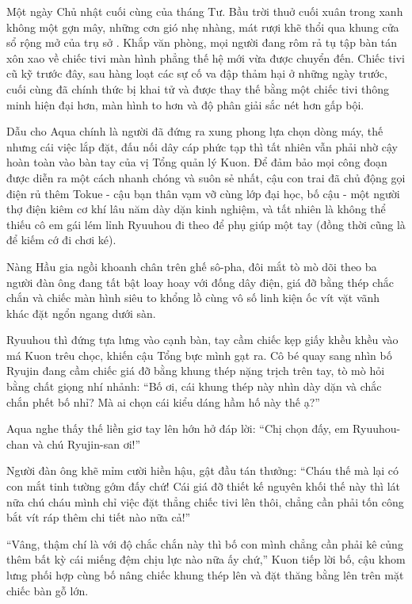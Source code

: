 \documentclass[../main.tex]{subfiles}
\begin{document}
Một ngày Chủ nhật cuối cùng của tháng Tư. Bầu trời thuở cuối xuân trong xanh không một gợn mây, những cơn gió nhẹ nhàng, mát rượi khẽ thổi qua khung cửa sổ rộng mở của trụ sở \hll. Khắp văn phòng, mọi người đang rôm rả tụ tập bàn tán xôn xao về chiếc tivi màn hình phẳng thế hệ mới vừa được chuyển đến. Chiếc tivi cũ kỹ trước đây, sau hàng loạt các sự cố va đập thảm hại ở những ngày trước, cuối cùng đã chính thức bị khai tử và được thay thế bằng một chiếc tivi thông minh hiện đại hơn, màn hình to hơn và độ phân giải sắc nét hơn gấp bội.

Dẫu cho Aqua chính là người đã đứng ra xung phong lựa chọn dòng máy, thế nhưng cái việc lắp đặt, đấu nối dây cáp phức tạp thì tất nhiên vẫn phải nhờ cậy hoàn toàn vào bàn tay của vị Tổng quản lý Kuon. Để đảm bảo mọi công đoạn được diễn ra một cách nhanh chóng và suôn sẻ nhất, cậu con trai đã chủ động gọi điện rủ thêm Tokue - cậu bạn thân vạm vỡ cùng lớp đại học, bố cậu - một người thợ điện kiêm cơ khí lâu năm dày dặn kinh nghiệm, và tất nhiên là không thể thiếu cô em gái lém lỉnh Ryuuhou đi theo để phụ giúp một tay (đồng thời cũng là để kiếm cớ đi chơi ké).

Nàng Hầu gia ngồi khoanh chân trên ghế sô-pha, đôi mắt tò mò dõi theo ba người đàn ông đang tất bật loay hoay với đống dây điện, giá đỡ bằng thép chắc chắn và chiếc màn hình siêu to khổng lồ cùng vô số linh kiện ốc vít vặt vãnh khác đặt ngổn ngang dưới sàn.

Ryuuhou thì đứng tựa lưng vào cạnh bàn, tay cầm chiếc kẹp giấy khều khều vào má Kuon trêu chọc, khiến cậu Tổng bực mình gạt ra. Cô bé quay sang nhìn bố Ryujin đang cầm chiếc giá đỡ bằng khung thép nặng trịch trên tay, tò mò hỏi bằng chất giọng nhí nhảnh: ``Bố ơi, cái khung thép này nhìn dày dặn và chắc chắn phết bố nhỉ? Mà ai chọn cái kiểu dáng hầm hố này thế ạ?''

Aqua nghe thấy thế liền giơ tay lên hớn hở đáp lời: ``Chị chọn đấy, em Ryuuhou-chan và chú Ryujin-san ơi!''

Người đàn ông khẽ mỉm cười hiền hậu, gật đầu tán thưởng: ``Cháu thế mà lại có con mắt tinh tường gớm đấy chứ! Cái giá đỡ thiết kế nguyên khối thế này thì lát nữa chú cháu mình chỉ việc đặt thẳng chiếc tivi lên thôi, chẳng cần phải tốn công bắt vít ráp thêm chi tiết nào nữa cả!''

``Vâng, thậm chí là với độ chắc chắn này thì bố con mình chẳng cần phải kê củng thêm bất kỳ cái miếng đệm chịu lực nào nữa ấy chứ,'' Kuon tiếp lời bố, cậu khom lưng phối hợp cùng bố nâng chiếc khung thép lên và đặt thăng bằng lên trên mặt chiếc bàn gỗ lớn.
\end{document}
